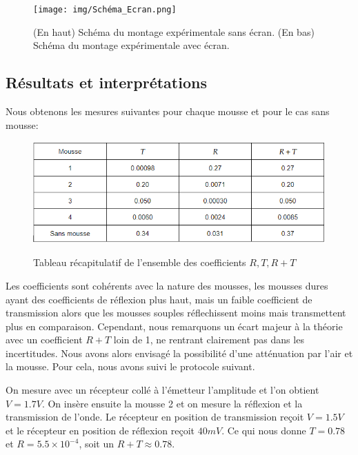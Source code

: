 \documentclass[12pt]{article}
\begin{document}
\begin{figure}[h!]
	\begin{center}
		\texttt{[image: img/Schéma\_Ecran.png]}
		\label{Schéma Ecran}
		\caption{(En haut) Schéma du montage expérimentale sans écran. (En bas) Schéma du montage expérimentale avec écran.}
	\end{center}
\end{figure} 

\break
\subsection{Résultats et interprétations}

Nous obtenons les mesures suivantes pour chaque mousse et pour le cas sans mousse:
\begin{figure}[h!]
	\begin{center}
		\includegraphics[scale=0.7]{img/tableau.png}
		\label{Stableau}
		\caption{Tableau récapitulatif de l'ensemble des coefficients $R, T, R+T$}
	\end{center}
\end{figure} 

Les coefficients sont cohérents avec la nature des mousses, les mousses dures ayant des coefficients de réflexion plus haut, mais un faible coefficient de transmission
alors que les mousses souples réflechissent moins mais transmettent plus en comparaison. Cependant, nous remarquons un écart majeur à la théorie avec un coefficient $R+T$ loin de 1, ne rentrant 
clairement pas dans les incertitudes. Nous avons alors envisagé la possibilité d'une atténuation par l'air et la mousse. Pour cela, nous avons suivi le protocole suivant. 

On mesure avec un récepteur collé à l'émetteur l'amplitude et l'on obtient $V = 1.7V$. On insère ensuite la mousse 2 et on mesure la réflexion et la transmission de l'onde.
Le récepteur en position de transmission reçoit $V=1.5V$ et le récepteur en position de réflexion reçoit $40mV$. Ce qui nous donne $T=0.78$ et $R=5.5\times 10^{-4}$, soit un $R+T \approx 0.78$. 
\end{document}
